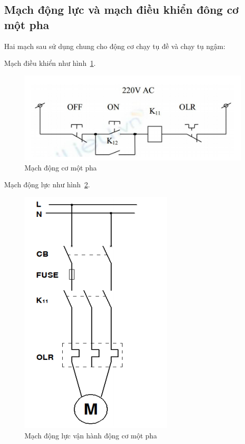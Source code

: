 \documentclass[13pt,a4paper]{extarticle}
\begin{document}
\subsection{Mạch động lực và mạch điều khiển đông cơ một pha}
Hai mạch sau sử dụng chung cho động cơ chạy tụ đề và chạy tụ ngậm:
\begin{list}{--}{}
\item Mạch điều khiển như hình~\ref{Fig:mach-dieu-khien-1p-tu-de}.
\begin{figure}[!h]
\begin{center}
\includegraphics[scale=.6]{van-hanh-1p-tu-de-1}
\end{center}
\caption{Mạch động cơ một pha}\label{Fig:mach-dieu-khien-1p-tu-de}
\end{figure}
\item Mạch động lực như hình~\ref{Fig:mach-dong-luc-1p-tu-de}.
\begin{figure}[!h]
\begin{center}
\includegraphics[scale=.6]{van-hanh-1p-tu-de}
\end{center}
\caption{Mạch động lực vận hành động cơ một pha}\label{Fig:mach-dong-luc-1p-tu-de}
\end{figure}
\end{list}
\end{document}
